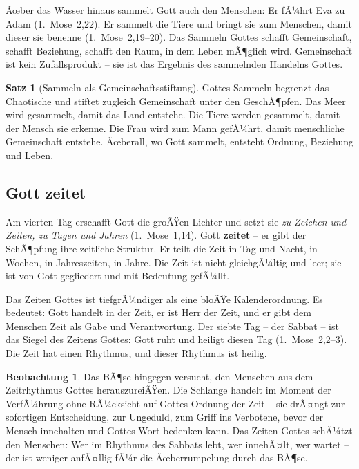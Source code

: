 ﻿\documentclass[a4paper,12pt]{article}
\theoremstyle{definition}
\newtheorem{theorem}{Satz}[section]
\newtheorem{observation}{Beobachtung}[section]
\begin{document}
Ãœber das Wasser hinaus sammelt Gott auch den Menschen: Er fÃ¼hrt Eva zu Adam
(1.~Mose~2,22). Er sammelt die Tiere und bringt sie zum Menschen, damit dieser
sie benenne (1.~Mose~2,19--20). Das Sammeln Gottes schafft Gemeinschaft, schafft
Beziehung, schafft den Raum, in dem Leben mÃ¶glich wird. Gemeinschaft ist kein
Zufallsprodukt -- sie ist das Ergebnis des sammelnden Handelns Gottes.

\begin{theorem}[Sammeln als Gemeinschaftsstiftung]
	Gottes Sammeln begrenzt das Chaotische und stiftet zugleich Gemeinschaft unter
	den GeschÃ¶pfen. Das Meer wird gesammelt, damit das Land entstehe. Die Tiere
	werden gesammelt, damit der Mensch sie erkenne. Die Frau wird zum Mann gefÃ¼hrt,
	damit menschliche Gemeinschaft entstehe. Ãœberall, wo Gott sammelt, entsteht
	Ordnung, Beziehung und Leben.
\end{theorem}

\subsection{Gott zeitet}

Am vierten Tag erschafft Gott die groÃŸen Lichter und setzt sie \textit{zu
	Zeichen und Zeiten, zu Tagen und Jahren} (1.~Mose~1,14). Gott \textbf{zeitet} --
er gibt der SchÃ¶pfung ihre zeitliche Struktur. Er teilt die Zeit in Tag und Nacht,
in Wochen, in Jahreszeiten, in Jahre. Die Zeit ist nicht gleichgÃ¼ltig und leer;
sie ist von Gott gegliedert und mit Bedeutung gefÃ¼llt.

Das Zeiten Gottes ist tiefgrÃ¼ndiger als eine bloÃŸe Kalenderordnung. Es bedeutet:
Gott handelt in der Zeit, er ist Herr der Zeit, und er gibt dem Menschen Zeit
als Gabe und Verantwortung. Der siebte Tag -- der Sabbat -- ist das Siegel des
Zeitens Gottes: Gott ruht und heiligt diesen Tag (1.~Mose~2,2--3). Die Zeit hat
einen Rhythmus, und dieser Rhythmus ist heilig.

\begin{observation}
	Das BÃ¶se hingegen versucht, den Menschen aus dem Zeitrhythmus Gottes
	herauszureiÃŸen. Die Schlange handelt im Moment der VerfÃ¼hrung ohne RÃ¼cksicht
	auf Gottes Ordnung der Zeit -- sie drÃ¤ngt zur sofortigen Entscheidung, zur
	Ungeduld, zum Griff ins Verbotene, bevor der Mensch innehalten und Gottes Wort
	bedenken kann. Das Zeiten Gottes schÃ¼tzt den Menschen: Wer im Rhythmus des
	Sabbats lebt, wer inne\-hÃ¤lt, wer wartet -- der ist weniger anfÃ¤llig fÃ¼r die
	Ãœberrumpelung durch das BÃ¶se.
\end{observation}
\end{document}
